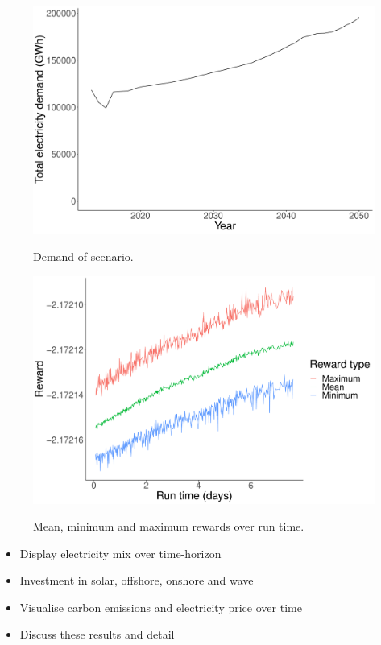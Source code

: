 \documentclass{article}
\begin{document}
\begin{figure}
\centering
\begin{minipage}{.5\textwidth}
  \centering
  \includegraphics[width=\linewidth]{figures/demand_plot.pdf}
  \caption{Demand of scenario.}
  \label{fig:steps_reward_plot}
\end{minipage}%
\begin{minipage}{.5\textwidth}
  \centering
  \includegraphics[width=\linewidth]{figures/runtime_days_plot.pdf}
  \caption{Mean, minimum and maximum rewards over run time.}
  \label{fig:days_reward_plot}
\end{minipage}
\caption{}
\end{figure}





\begin{itemize}
	\item Display electricity mix over time-horizon
	\item Investment in solar, offshore, onshore and wave
	\item Visualise carbon emissions and electricity price over time
	\item Discuss these results and detail 
\end{itemize}





\end{document}
